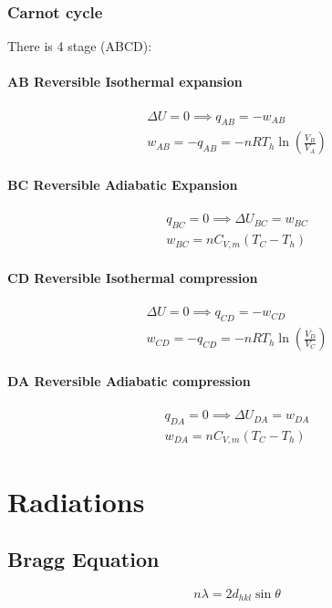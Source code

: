 \documentclass[a4paper]{report}
\begin{document}
\begin{multicols}{2}
      \subsection{Carnot cycle}
      There is 4 stage (ABCD):
        \subsubsection{AB Reversible Isothermal expansion}
        \begin{gather*}
          \Delta U = 0 \implies q_{AB} = -w_{AB}\\
          w_{AB} = -q_{AB} = -nRT_{h}\ln \left(\frac{V_{B}}{V_{A}} \right)
        \end{gather*}
        \subsubsection{BC Reversible Adiabatic Expansion}
        \begin{gather*}
          q_{BC} = 0 \implies \Delta U_{BC} = w_{BC}\\
          w_{BC} = nC_{V,m}(T_{C}-T_{h})  
        \end{gather*}
        \subsubsection{CD Reversible Isothermal compression}
        \begin{gather*}
          \Delta U = 0 \implies q_{CD} = -w_{CD}\\
          w_{CD} = -q_{CD} = -nRT_{h}\ln \left (\frac{V_{D}}{V_{C}} \right )
        \end{gather*}
        \subsubsection{DA Reversible Adiabatic compression}
        \begin{gather*}
          q_{DA} = 0 \implies \Delta U_{DA} = w_{DA}\\
          w_{DA} = nC_{V,m}(T_{C}-T_{h})  
        \end{gather*}

        
        
      

  \end{multicols}

\chapter{Radiations} 

  \begin{multicols}{2}
  
    \section{Bragg Equation}

      $$n \lambda = 2d_{hkl} \sin \theta$$

 \end{multicols}
\end{document}
